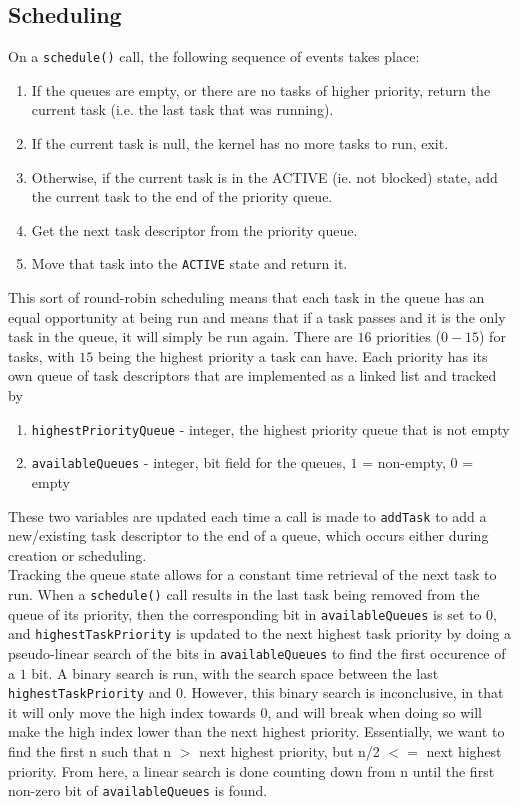 \documentclass[12pt]{article}
\begin{document}
\subsection{Scheduling}
On a \texttt{schedule()} call, the following sequence of events takes place:
\begin{enumerate}
  \item If the queues are empty, or there are no tasks of higher priority, return the current task (i.e. the last task that was running).
  \item If the current task is null, the kernel has no more tasks to run, exit.
  \item Otherwise, if the current task is in the ACTIVE (ie. not blocked) state, add the current task to the end of the priority queue.
  \item Get the next task descriptor from the priority queue.
  \item Move that task into the \texttt{ACTIVE} state and return it.
\end{enumerate}
This sort of round-robin scheduling means that each task in the queue has an equal opportunity at being run and means that if a task passes and it is the only task in the queue, it will simply be run again.  There are $16$ priorities ($0 - 15$) for tasks, with $15$ being the highest priority a task can have.  Each priority has its own queue of task descriptors that are implemented as a linked list and tracked by
\begin{enumerate}
  \item \texttt{highestPriorityQueue} - integer, the highest priority queue that is not empty
  \item \texttt{availableQueues} - integer, bit field for the queues, $1$ = non-empty, $0$ = empty
\end{enumerate}
These two variables are updated each time a call is made to \texttt{addTask} to add a new/existing task descriptor to the end of a queue, which occurs either during creation or scheduling.\\

Tracking the queue state allows for a constant time retrieval of the next task to run.  When a \texttt{schedule()} call results in the last task being removed from the queue of its priority, then the corresponding bit in \texttt{availableQueues} is set to $0$, and \texttt{highestTaskPriority} is updated to the next highest task priority by doing a pseudo-linear search of the bits in \texttt{availableQueues} to find the first occurence of a $1$ bit.  A binary search is run, with the search space between the last \texttt{highestTaskPriority} and $0$.  However, this binary search is inconclusive, in that it will only move the high index towards 0, and will break when doing so will make the high index lower than the next highest priority. Essentially, we want to find the first n such that n $>$ next highest priority, but n/2 $<=$ next highest priority. From here, a linear search is done counting down from n until the first non-zero bit of \texttt{availableQueues} is found. \\
\end{document}
